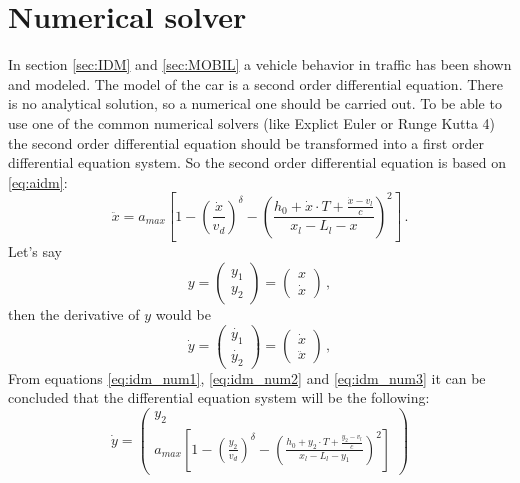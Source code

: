\documentclass[a4paper,11pt,twoside]{report}
\begin{document}
		\section{Numerical solver}
			In section \ref{sec:IDM} and \ref{sec:MOBIL} a vehicle behavior in traffic has been shown and modeled. The model of the car is a second order differential equation. There is no analytical solution, so a numerical one should be carried out. To be able to use one of the common numerical solvers (like Explict Euler or Runge Kutta 4) the second order differential equation should be transformed into a first order differential equation system. So the second order differential equation is based on \ref{eq:aidm}:
			\begin{equation}
				\ddot{x}=a_{max}\left [ 1 - \left ( \frac{\dot{x}}{v_d} \right )^\delta - \left ( \frac{h_0 + \dot{x}\cdot T + \frac{\dot{x}-v_l}{c}}{x_l-L_l - x} \right )^2 \right ]\,.
				\label{eq:idm_num1}
			\end{equation}
			Let's say
			\begin{equation}
				y=
				\begin{pmatrix}
					y_1\\
					y_2
				\end{pmatrix}
				=
				\begin{pmatrix}
					x\\
					\dot{x}
				\end{pmatrix}\,,
				\label{eq:idm_num2}
			\end{equation}
			then the derivative of $y$ would be
			\begin{equation}
				\dot{y}=
				\begin{pmatrix}
					\dot{y_1}\\
					\dot{y_2}
				\end{pmatrix}
				=
				\begin{pmatrix}
					\dot{x}\\
					\ddot{x}
				\end{pmatrix}\,,
				\label{eq:idm_num3}
			\end{equation}
			From equations \ref{eq:idm_num1}, \ref{eq:idm_num2} and \ref{eq:idm_num3} it can be concluded that the differential equation system will be the following:
			\begin{equation}
				 \dot{y}=
				 \begin{pmatrix}
				 	y_2\\
				 	a_{max}\left [ 1 - \left ( \frac{y_2}{v_d} \right )^\delta - \left ( \frac{h_0 + y_2\cdot T + \frac{y_2-v_l}{c}}{x_l-L_l - y_1} \right )^2 \right ]
				 \end{pmatrix}
			\end{equation}
\end{document}
